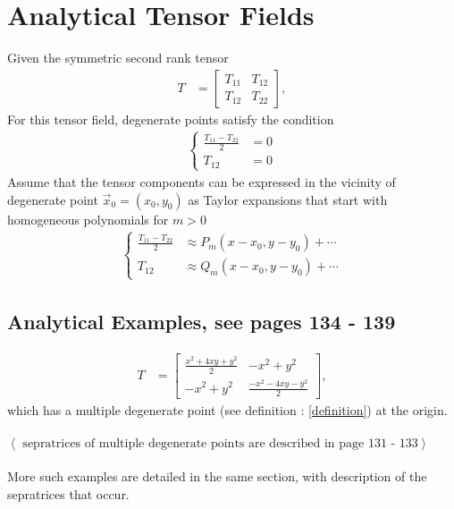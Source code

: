 \documentclass[12pt,twoside,onecolumn]{article}
\theoremstyle{definition}
\begin{document}
\section{Analytical Tensor Fields}
Given the symmetric second rank tensor
\begin{align*} 
T&=
\begin{bmatrix}
    T_{11} &  T_{12} \\
    T_{12}  &  T_{22}
\end{bmatrix},
\end{align*}
For this tensor field, degenerate points satisfy the condition
\begin{align} \label{degenerate_cond}
\left\{\begin{matrix}
 \frac{T_{11} - T_{22}}{2} &=0 \\
 T_{12} &=0
\end{matrix}\right.
\end{align}
Assume that the tensor components can be expressed in the vicinity of degenerate point 
$\vec{x}_0 = (x_0,y_0)$ as Taylor expansions that start with homogeneous polynomials 
for $m > 0$
\begin{align}
\left\{\begin{matrix}
 \frac{T_{11} - T_{22}}{2} &\approx P_m(x - x_0, y - y_0) + \cdots \\
 T_{12} &\approx Q_m(x - x_0, y - y_0) + \cdots
\end{matrix}\right.
\end{align}

\subsection{Analytical Examples, see pages 134 - 139}
\begin{align*}
T&=
\begin{bmatrix}
    \frac{x^2 + 4xy + y^2}{2} &  -x^2 + y^2 \\
    -x^2 + y^2  &  \frac{-x^2 - 4xy - y^2}{2}
\end{bmatrix},
\end{align*}
which has a multiple degenerate point (see definition : \ref{definition}) at the origin.
\\
\\
$\left<\mbox{ sepratrices of multiple degenerate points are described in page 131 - 133
}\right>$
\\
\\
More such examples are detailed in the same section, with description of the sepratrices
that occur.
\end{document}
